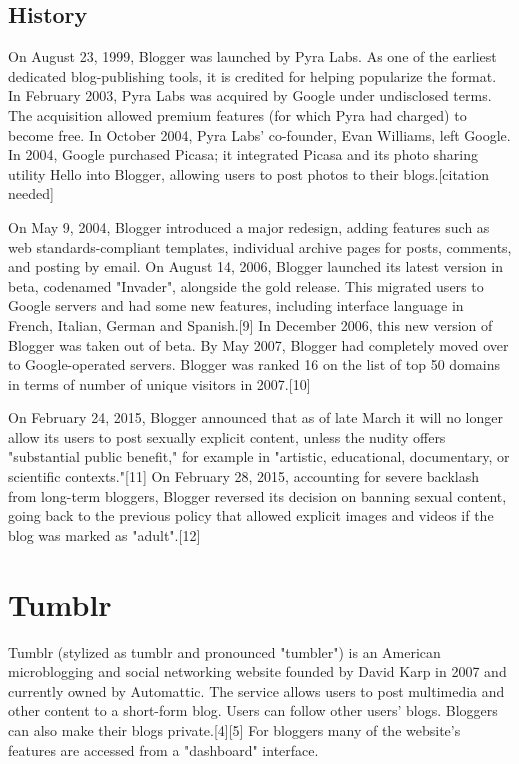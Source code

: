 \documentclass[12pt]{article}
\begin{document}
\subsection{History}


On August 23, 1999, Blogger was launched by Pyra Labs. As one of the earliest dedicated blog-publishing tools, it is credited for helping popularize the format. In February 2003, Pyra Labs was acquired by Google under undisclosed terms. The acquisition allowed premium features (for which Pyra had charged) to become free. In October 2004, Pyra Labs' co-founder, Evan Williams, left Google. In 2004, Google purchased Picasa; it integrated Picasa and its photo sharing utility Hello into Blogger, allowing users to post photos to their blogs.[citation needed]

On May 9, 2004, Blogger introduced a major redesign, adding features such as web standards-compliant templates, individual archive pages for posts, comments, and posting by email. On August 14, 2006, Blogger launched its latest version in beta, codenamed "Invader", alongside the gold release. This migrated users to Google servers and had some new features, including interface language in French, Italian, German and Spanish.[9] In December 2006, this new version of Blogger was taken out of beta. By May 2007, Blogger had completely moved over to Google-operated servers. Blogger was ranked 16 on the list of top 50 domains in terms of number of unique visitors in 2007.[10]

On February 24, 2015, Blogger announced that as of late March it will no longer allow its users to post sexually explicit content, unless the nudity offers "substantial public benefit," for example in "artistic, educational, documentary, or scientific contexts."[11] On February 28, 2015, accounting for severe backlash from long-term bloggers, Blogger reversed its decision on banning sexual content, going back to the previous policy that allowed explicit images and videos if the blog was marked as "adult".[12] 




\section{Tumblr}



Tumblr (stylized as tumblr and pronounced "tumbler") is an American microblogging and social networking website founded by David Karp in 2007 and currently owned by Automattic. The service allows users to post multimedia and other content to a short-form blog. Users can follow other users' blogs. Bloggers can also make their blogs private.[4][5] For bloggers many of the website's features are accessed from a "dashboard" interface.
\end{document}
